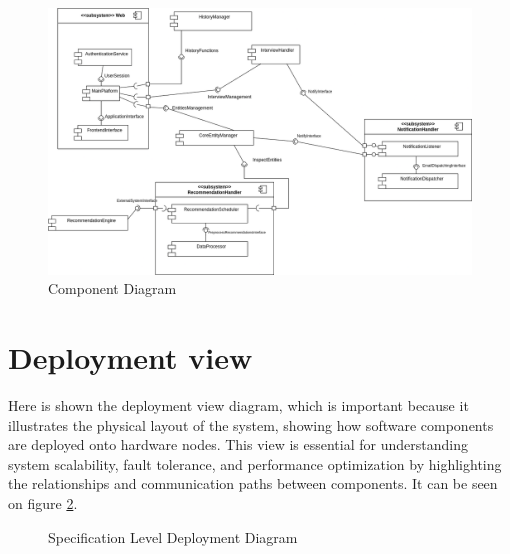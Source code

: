 \begin{figure}[H]
    \centering
    \includegraphics[width=\textwidth]{Images/component-view.png}
    \caption{Component Diagram}
    \label{fig:component_diagram}
\end{figure}

\section{Deployment view}

Here is shown the deployment view diagram, which is important because it illustrates the physical layout of the system, showing how software components are deployed onto hardware nodes. This view is essential for understanding system scalability, fault tolerance, and performance optimization by highlighting the relationships and communication paths between components. It can be seen on figure \ref{fig:deployment_diagram}.

\begin{figure}[H]
    \centering
    \caption{Specification Level Deployment Diagram}
    \label{fig:deployment_diagram}
\end{figure}

